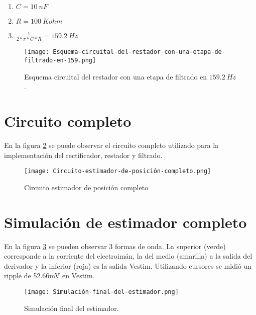 \begin{enumerate}
	\item  $C=10\ nF$
	
	\item  $R=100\ Kohm$
	
	\item  $\frac{1}{2*\pi *C*R}=159.2\ Hz$
\end{enumerate}

\begin{figure}[H]
	\centering
	\texttt{[image: Esquema-circuital-del-restador-con-una-etapa-de-filtrado-en-159.png]}
	\caption{Esquema circuital del restador con una etapa de filtrado en $159.2\ Hz$.}
	\label{fig:img_Esquema-circuital-del-restador-con-una-etapa-de-filtrado-en-159}
\end{figure}

\section{Circuito completo}

\noindent En la figura \ref{fig:img_Circuito_estimador_de_posición_completo} se puede observar el circuito completo utilizado para la implementaci\'{o}n del rectificador, restador y filtrado.

\begin{figure}[H]
	\centering
	\texttt{[image: Circuito-estimador-de-posición-completo.png]}
	\caption{Circuito estimador de posición completo}
	\label{fig:img_Circuito_estimador_de_posición_completo}
\end{figure}

\section{Simulaci\'{o}n de estimador completo}

\noindent En la figura \ref{fig:img_Simulación_final_del_estimado} se pueden observar 3 formas de onda. La superior (verde) corresponde a la corriente del electroim\'{a}n, la del medio (amarilla) a la salida del derivador y la inferior (roja) es la salida Vestim. Utilizando cursores se midi\'{o} un ripple de 52.66mV en Vestim.

\begin{figure}[H]
	\centering
	\texttt{[image: Simulación-final-del-estimador.png]}
	\caption{Simulación final del estimador.}
	\label{fig:img_Simulación_final_del_estimado}
\end{figure}

